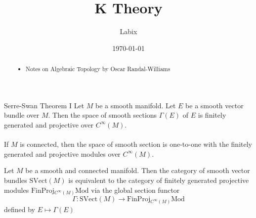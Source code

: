 \documentclass[a4paper]{article}
\title{K Theory}
\author{Labix}
\date{\today}
\begin{document}
\maketitle
\begin{abstract}
\begin{itemize}
\item Notes on Algebraic Topology by Oscar Randal-Williams
\end{itemize}
\end{abstract}
\pagebreak
\tableofcontents

\pagebreak

\section{}
\subsection{}
\begin{thm}{Serre-Swan Theorem I}{} Let $M$ be a smooth manifold. Let $E$ be a smooth vector bundle over $M$. Then the space of smooth sections $\Gamma(E)$ of $E$ is finitely generated and projective over $C^\infty(M)$. \\~\\

If $M$ is connected, then the space of smooth section is one-to-one with the finitely generated and projective modules over $C^\infty(M)$. 
\end{thm}

\begin{thm}{}{} Let $M$ be a smooth and connected manifold. Then the category of smooth vector bundles $\text{SVect}(M)$ is equivalent to the category of finitely generated projective modules $\text{FinProj}{_{C^\infty(M)}\text{Mod}}$ via the global section functor $$\Gamma:\text{SVect}(M)\to\text{FinProj}{_{C^\infty(M)}\text{Mod}}$$ defined by $E\mapsto\Gamma(E)$
\end{thm}
\end{document}
